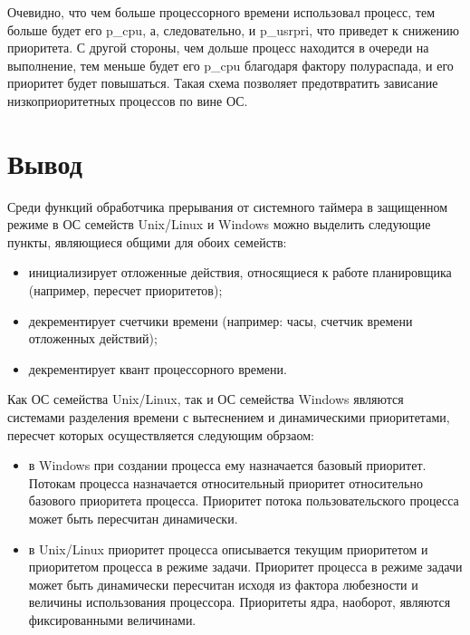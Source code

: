 \documentclass[12pt]{report}
\begin{document}
Очевидно, что чем больше процессорного времени использовал процесс, тем больше будет его p\_cpu, а, следовательно, и p\_usrpri, что приведет к снижению приоритета. С другой стороны, чем дольше процесс находится в очереди на выполнение, тем меньше будет его p\_cpu благодаря фактору полураспада, и его приоритет будет повышаться. Такая схема позволяет предотвратить зависание низкоприоритетных процессов по вине ОС.

\chapter{Вывод}

Среди функций обработчика прерывания от системного таймера в защищенном режиме в ОС семейств Unix/Linux и Windows можно выделить следующие пункты, являющиеся общими для обоих семейств:
\begin{itemize}
\item инициализирует отложенные действия, относящиеся к работе планировщика (например, пересчет приоритетов);
\item декрементирует счетчики времени (например: часы, счетчик времени отложенных действий);
\item декрементирует квант процессорного времени.
\end{itemize}

Как ОС семейства Unix/Linux, так и ОС семейства Windows являются системами разделения времени с вытеснением и динамическими приоритетами, пересчет которых осуществляется следующим обрзаом:
\begin{itemize}
\item в Windows при создании процесса ему назначается базовый приоритет. Потокам процесса назначается относительный приоритет относительно базового приоритета процесса. Приоритет потока пользовательского процесса может быть пересчитан динамически. 
\item в Unix/Linux приоритет процесса описывается текущим приоритетом и приоритетом процесса в режиме задачи. Приоритет процесса в режиме задачи может быть динамически пересчитан исходя из фактора любезности и величины использования процессора. Приоритеты ядра, наоборот, являются фиксированными величинами.
\end{itemize}
\end{document}
